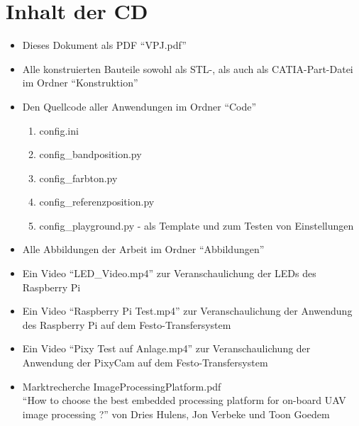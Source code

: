 
\chapter{Inhalt der CD}
\begin{itemize}
    \item Dieses Dokument als PDF "`VPJ.pdf"' \\

    \item Alle konstruierten Bauteile sowohl als STL-, als auch als CATIA-Part-Datei im Ordner "`Konstruktion"' \\

    \item Den Quellcode aller Anwendungen im Ordner "`Code"'
		\begin{enumerate}
			\item config.ini
			\item config\_bandposition.py
			\item config\_farbton.py
			\item config\_referenzposition.py
			\item config\_playground.py - als Template und zum Testen von Einstellungen
		\end{enumerate}

    \item Alle Abbildungen der Arbeit im Ordner "`Abbildungen"' \\
		
    \item Ein Video "`LED\_Video.mp4"' zur Veranschaulichung der LEDs des Raspberry Pi\\
    \item Ein Video "`Raspberry Pi Test.mp4"' zur Veranschaulichung der Anwendung des Raspberry Pi auf dem Festo-Transfersystem\\
    \item Ein Video "`Pixy Test auf Anlage.mp4"' zur Veranschaulichung der Anwendung der PixyCam auf dem Festo-Transfersystem\\

    \item Marktrecherche ImageProcessingPlatform.pdf \\ "`How to choose the best embedded processing platform for on-board UAV
image processing ?"' von Dries Hulens, Jon Verbeke und Toon Goedem\\




\end{itemize}
